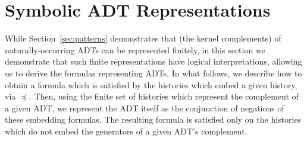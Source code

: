 \section{Symbolic ADT Representations}
\label{sec:formula}

While Section~\ref{sec:patterns} demonstrates that (the kernel complements) of
naturally-occurring ADTs can be represented finitely, in this section we
demonstrate that such finite representations have logical interpretations,
allowing us to derive the formulas representing ADTs. In what follows, we
describe how to obtain a formula which is satisfied by the histories which
embed a given history, via $\preceq$. Then, using the finite set of histories
which represent the complement of a given ADT, we represent the ADT itself as
the conjunction of negations of these embedding formulas. The resulting formula
is satisfied only on the histories which do not embed the generators of a given
ADT’s complement.

